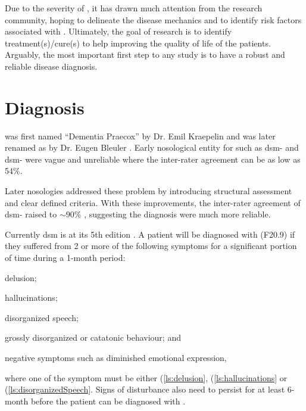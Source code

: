 	Due to the severity of , it has drawn much attention from the research community, hoping to delineate the disease mechanics and to identify risk factors associated with .
	Ultimately, the goal of  research is to identify treatment(s)/cure(s) to help improving the quality of life of the patients.
	Arguably, the most important first step to any  study is to have a robust and reliable disease diagnosis.
	
	\section{Diagnosis}
	 was first named ``Dementia Praecox'' by Dr. Emil Kraepelin and was later renamed as  by Dr. Eugen Bleuler \citep{Jablensky2010}.
	Early nosological entity for  such as \gls{dsm}- and \gls{dsm}- were vague and unreliable where the inter-rater agreement can be as low as 54\%. \citep{Tsuang2000,Harvey2012} 
	
	Later nosologies addressed these problem by introducing structural assessment and clear defined criteria. 
	With these improvements, the inter-rater agreement of \gls{dsm}- raised to $\sim 90\%$ \citep{Harvey2012}, suggesting the diagnosis were much more reliable.
	
	Currently \gls{dsm} is at its 5th edition \citep{AmericanPsychiatricAssociation2013}. 
	A patient will be diagnosed with  (F20.9) if they suffered from 2 or more of the following symptoms for a significant portion of time during a 1-month period: 
	\begin{enumerate*}[label=\arabic*\upshape)]
		\item delusion; \label{ls:delusion}
		\item hallucinations;\label{ls:hallucinations}
		\item disorganized speech;\label{ls:disorganizedSpeech}
		\item grossly disorganized or catatonic behaviour; and\label{ls:catatonicBehavior}
		\item negative symptoms such as diminished emotional expression,\label{ls:negativeSymptoms}
	\end{enumerate*}  where one of the symptom must be either (\ref{ls:delusion}, (\ref{ls:hallucinations} or (\ref{ls:disorganizedSpeech}.
	Signs of disturbance also need to persist for at least 6-month before the patient can be diagnosed with .
	
